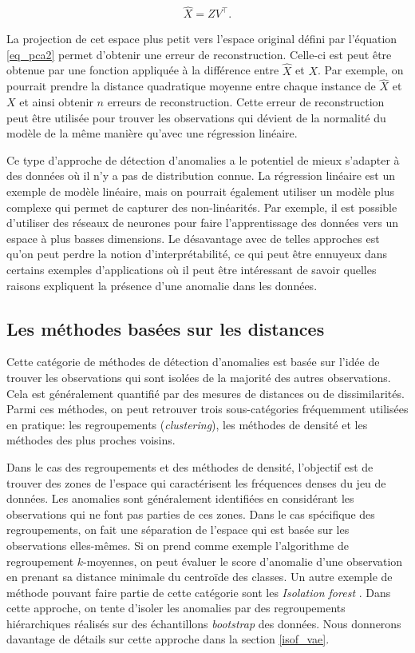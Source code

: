   \begin{gather}  \label{eq_pca2}
 \hat{X} = ZV^\top.
 \end{gather}
 
La projection de cet espace plus petit vers l'espace original défini par l'équation \ref{eq_pca2} permet d'obtenir une erreur de reconstruction. Celle-ci est peut être obtenue par une fonction appliquée à la différence entre $\hat{X}$ et $X$. Par exemple, on pourrait prendre la distance quadratique moyenne entre chaque instance de $\hat{X}$ et $X$ et ainsi obtenir $n$ erreurs de reconstruction. Cette erreur de reconstruction peut être utilisée pour trouver les observations qui dévient de la normalité du modèle de la même manière qu'avec une régression linéaire.
  
Ce type d'approche de détection d'anomalies a le potentiel de mieux s'adapter à des données où il n'y a pas de distribution connue. La régression linéaire est un exemple de modèle linéaire, mais on pourrait également utiliser un modèle plus complexe qui permet de capturer des non-linéarités. Par exemple, il est possible d'utiliser des réseaux de neurones pour faire l'apprentissage des données vers un espace à plus basses dimensions. Le désavantage avec de telles approches est qu'on peut perdre la notion d'interprétabilité, ce qui peut être ennuyeux dans certains exemples d'applications où il peut être intéressant de savoir quelles raisons expliquent la présence d'une anomalie dans les données.

\subsection{Les méthodes basées sur les distances}

Cette catégorie de méthodes de détection d'anomalies est basée sur l'idée de trouver les observations qui sont isolées de la majorité des autres observations. Cela est généralement quantifié par des mesures de distances ou de dissimilarités. Parmi ces méthodes, on peut retrouver trois	 sous-catégories fréquemment utilisées en pratique: les regroupements (\textit{clustering}), les méthodes de densité et les méthodes des plus proches voisins.

Dans le cas des regroupements et des méthodes de densité, l'objectif est de trouver des zones de l'espace qui caractérisent les fréquences denses du jeu de données. Les anomalies sont généralement identifiées en considérant les observations qui ne font pas parties de ces zones. Dans le cas spécifique des regroupements, on fait une séparation de l'espace qui est basée sur les observations elles-mêmes. Si on prend comme exemple l'algorithme de regroupement $k$-moyennes, on peut évaluer le score d'anomalie d'une observation en prenant sa distance minimale du centroïde des classes. Un autre exemple de méthode pouvant faire partie de cette catégorie sont les \textit{Isolation forest} \citep{4781136}. Dans cette approche, on tente d'isoler les anomalies par des regroupements hiérarchiques réalisés sur des échantillons \textit{bootstrap} des données. Nous donnerons davantage de détails sur cette approche dans la section \ref{isof_vae}.

